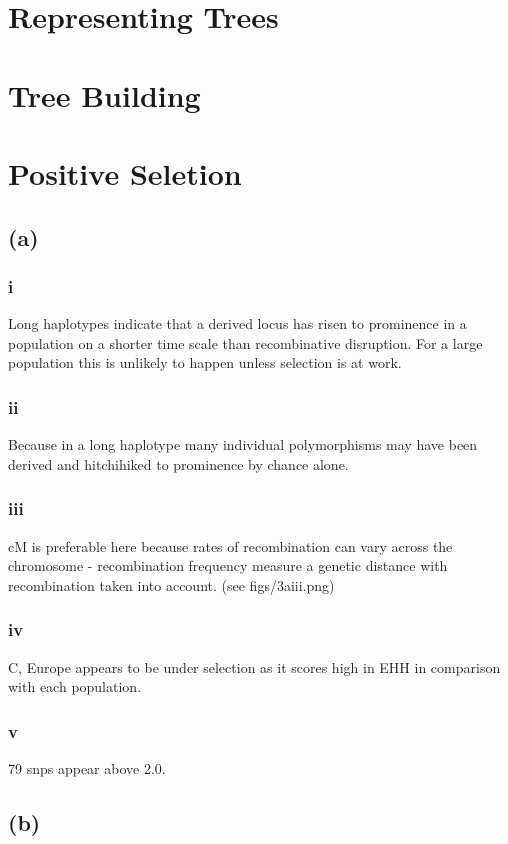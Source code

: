 \documentclass[12pt,draft,a4paper]{article}
\begin{document}

\setlength{\parindent}{0in}

\section{Representing Trees}

\section{Tree Building}

\section{Positive Seletion}
\subsection*{(a)}
\subsubsection*{i}
Long haplotypes indicate that a derived locus has risen to  prominence in a population on a shorter time scale than recombinative disruption. For a large population this is unlikely to happen unless selection is at work.
\subsubsection*{ii}
Because in a long haplotype many individual polymorphisms may have been derived and hitchihiked to prominence by chance alone.
\subsubsection*{iii}
cM is preferable here because rates of recombination can vary across the chromosome - recombination frequency measure a genetic distance with recombination taken into account. (see figs/3aiii.png)
\subsubsection*{iv}
C, Europe appears to be under selection as it scores high in EHH in comparison with each population.
\subsubsection*{v}
79 snps appear above 2.0.
\subsection*{(b)}
\end{document}

